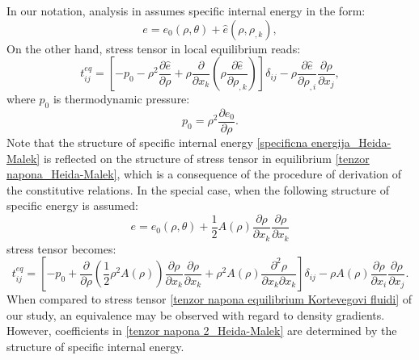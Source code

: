 \documentclass[a4paper,fleqn]{cas-sc}
\theoremstyle{definition}
\begin{document}
In our notation, analysis in \cite{heida2010compressible} assumes specific internal energy in the form: 
\begin{equation} \label{specificna energija_Heida-Malek}
	e = e_{0}(\rho, \theta) + \hat{e}(\rho, \rho_{,k}), 
\end{equation}
On the other hand, stress tensor in local equilibrium reads:
\begin{equation} \label{tenzor napona_Heida-Malek}
	t_{ij}^{eq} = \left[ - p_{0} - \rho^{2} \frac{\partial \hat{e}}{\partial \rho} 
	+ \rho \frac{\partial}{\partial x_{k}} \left( 
	\rho \frac{\partial \hat{e}}{\partial \rho_{,k}} \right) \right] \delta_{ij}
	- \rho \frac{\partial \hat{e}}{\partial \rho_{,i}} \frac{\partial \rho}{\partial x_{j}}, 
\end{equation}
where $p_{0}$ is thermodynamic pressure: 
\begin{equation} \label{pritisak_Heida-Malek}
	p_{0} = \rho^{2} \frac{\partial e_{0}}{\partial \rho}. 
\end{equation}
Note that the structure of specific internal energy \eqref{specificna energija_Heida-Malek} is reflected on the structure of stress tensor in equilibrium \eqref{tenzor napona_Heida-Malek}, which is a consequence of the procedure of derivation of the constitutive relations. In the special case, when the following structure of specific energy is assumed: 
\begin{equation} \label{specificna energija kvadratna_Heida-Malek}
	e = e_{0}(\rho, \theta) + \frac{1}{2} A(\rho) \frac{\partial \rho}{\partial x_{k}} 
	\frac{\partial \rho}{\partial x_{k}}
\end{equation} 
stress tensor becomes:
\begin{equation} \label{tenzor napona 2_Heida-Malek}
	t_{ij}^{eq} = \left[ - p_{0} + \frac{\partial}{\partial \rho} 
	\left( \frac{1}{2} \rho^{2} A(\rho) \right) \frac{\partial \rho}{\partial x_{k}} 
	\frac{\partial \rho}{\partial x_{k}} 
	+ \rho^{2} A(\rho) \frac{\partial^{2} \rho}{\partial x_{k} \partial x_{k}} \right] \delta_{ij}
	- \rho A(\rho) \frac{\partial \rho}{\partial x_{i}} \frac{\partial \rho}{\partial x_{j}}. 
\end{equation}
When compared to stress tensor \eqref{tenzor napona equilibrium Kortevegovi fluidi} of our study, an equivalence may be observed with regard to density gradients. However, coefficients in \eqref{tenzor napona 2_Heida-Malek} are determined by the structure of specific internal energy. 
\end{document}
